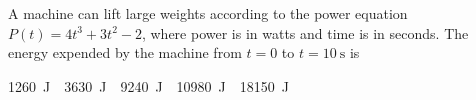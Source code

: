 \documentclass{../../oss-apphys-exam}
\newcounter{lastmc}
\begin{document}
\begin{multicols*}{2}
\begin{questions}
%
%
    
    \question A machine can lift large weights according to the power equation
    $P(t)=4t^3+3t^2-2$, where power is in watts and time is in seconds. The
    energy expended by the machine from $t=0$ to $t=\SI{10}{\second}$ is
    \begin{choices}
      \choice \SI{1260}\joule
      \choice \SI{3630}\joule
      \choice \SI{9240}\joule
      \choice \SI{10980}\joule
      \choice \SI{18150}\joule
    \end{choices}
  \end{questions}
  \setcounter{lastmc}{\value{question}}
\end{multicols*}
\newpage
\end{document}
